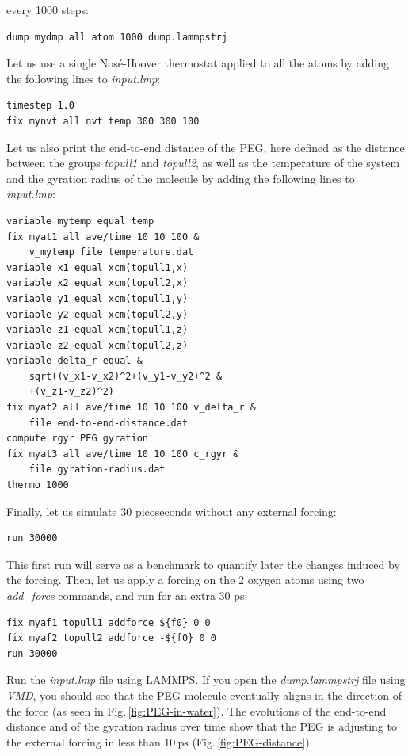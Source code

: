 \documentclass[9pt,tutorial]{livecoms}
\begin{document}
every 1000 steps:
{\normalsize \begin{verbatim}
dump mydmp all atom 1000 dump.lammpstrj
\end{verbatim}}
Let us use a single Nosé-Hoover thermostat applied to all the atoms by adding the
following lines to \textit{input.lmp}:
{\normalsize \begin{verbatim}
timestep 1.0
fix mynvt all nvt temp 300 300 100
\end{verbatim}}
Let us also print the end-to-end distance of the PEG,
here defined as the distance between the groups \textit{topull1}
and \textit{topull2}, as well as the temperature of the system and the gyration
radius of the molecule \cite{fixmanRadiusGyrationPolymer1962a}
by adding the following lines to \textit{input.lmp}:
{\normalsize \begin{verbatim}
variable mytemp equal temp
fix myat1 all ave/time 10 10 100 &
    v_mytemp file temperature.dat
variable x1 equal xcm(topull1,x)
variable x2 equal xcm(topull2,x)
variable y1 equal xcm(topull1,y)
variable y2 equal xcm(topull2,y)
variable z1 equal xcm(topull1,z)
variable z2 equal xcm(topull2,z)
variable delta_r equal &
    sqrt((v_x1-v_x2)^2+(v_y1-v_y2)^2 &
    +(v_z1-v_z2)^2)
fix myat2 all ave/time 10 10 100 v_delta_r &
    file end-to-end-distance.dat
compute rgyr PEG gyration
fix myat3 all ave/time 10 10 100 c_rgyr &
    file gyration-radius.dat
thermo 1000
\end{verbatim}}
Finally, let us simulate 30 picoseconds without any external forcing:
{\normalsize \begin{verbatim}
run 30000
\end{verbatim}}
This first run will serve as a benchmark to quantify later the changes induced
by the forcing. Then, let us apply a forcing on the 2 oxygen atoms using two
\textit{add\_force} commands, and run for an extra 30 ps:
{\normalsize \begin{verbatim}
fix myaf1 topull1 addforce ${f0} 0 0
fix myaf2 topull2 addforce -${f0} 0 0
run 30000
\end{verbatim}}
Run the \textit{input.lmp} file using LAMMPS. If you open the \textit{dump.lammpstrj}
file using \textit{VMD}, you should see that the PEG molecule eventually aligns
in the direction of the force (as seen in Fig.\,\ref{fig:PEG-in-water}).
The evolutions of the end-to-end distance and of the gyration radius over
time show that the PEG is adjusting to the external forcing in less than
$10~\text{ps}$ (Fig.\,\ref{fig:PEG-distance}).
\end{document}
